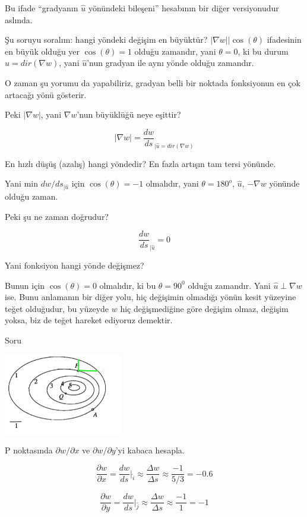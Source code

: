 \documentclass[12pt,fleqn]{article}\usepackage{../../common}
\begin{document}
Bu ifade ``gradyanın $\hat{u}$ yönündeki bileşeni'' hesabının bir diğer
versiyonudur aslında. 


Şu soruyu soralım: hangi yöndeki değişim en büyüktür? $|\nabla
w||\cos(\theta)$ ifadesinin en büyük olduğu yer $\cos(\theta)=1$ olduğu
zamandır, yani $\theta = 0$, ki bu durum $\hat{u} = dir(\nabla w)$, yani
$\hat{u}$'nun gradyan ile aynı yönde olduğu zamandır.

O zaman şu yorumu da yapabiliriz, gradyan belli bir noktada fonksiyonun en
çok artacağı yönü gösterir. 

Peki $|\nabla w|$, yani $\nabla w$'nun büyüklüğü neye eşittir? 

$$ |\nabla w| =   \frac{dw}{ds}_{|\hat{u}=dir(\nabla w)}  $$

En hızlı düşüş (azalış) hangi yöndedir? En fazla artışın tam tersi
yönünde. 

Yani min $dw/ds_{|\hat{u}}$ için $\cos(\theta) = -1$ olmalıdır, yani $\theta =
180^o$,  $\hat{u}$, $-\nabla w$  yönünde olduğu zaman.

Peki şu ne zaman doğrudur? 

$$ \frac{dw}{ds}_{|\hat{u}} = 0 $$

Yani fonksiyon hangi yönde değişmez? 

Bunun için $\cos(\theta) = 0$ olmalıdır, ki bu $\theta = 90^0$ olduğu
zamandır. Yani $\hat{u} \perp \nabla w$ ise. Bunu anlamanın bir diğer yolu, hiç
değişimin olmadığı yönün kesit yüzeyine teğet olduğudur, bu yüzeyde $w$ hiç
değişmediğine göre değişim olmaz, değişim yoksa, biz de teğet hareket ediyoruz
demektir.

Soru
\begin{center}
\includegraphics[height=3.5cm]{2d9.png}
\end{center}
P noktasında $\partial w/ \partial x$ ve $\partial w/\partial y$'yi 
kabaca hesapla. 

$$ \frac{\partial w}{\partial x} = \frac{dw}{ds} \bigg|_{\hat{i}} \approx
\frac{\Delta w}{\Delta s} \approx
\frac{-1}{5/3} = -0.6
$$

$$ \frac{\partial w}{\partial y} = \frac{dw}{ds} \bigg|_{\hat{j}} \approx
\frac{\Delta w}{\Delta s} \approx
\frac{-1}{1} = -1
$$
\end{document}
